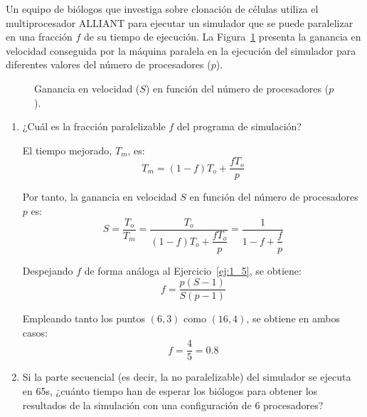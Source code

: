 \begin{ejercicio}
Un equipo de biólogos que investiga sobre clonación de células utiliza el multiprocesador ALLIANT para ejecutar un simulador que se puede paralelizar en una fracción $f$ de su tiempo de ejecución. La Figura~\ref{fig:1_10} presenta la ganancia en velocidad conseguida por la máquina paralela en la ejecución del simulador para diferentes valores del número de procesadores ($p$).
\begin{figure}
    \centering
    \caption{Ganancia en velocidad ($S$) en función del número de procesadores ($p$).}
    \label{fig:1_10}
\end{figure}
\begin{enumerate}
    \item ¿Cuál es la fracción paralelizable $f$ del programa de simulación?
    
    El tiempo mejorado, $T_m$, es:
    \begin{equation*}
        T_m = (1-f)T_o + \dfrac{fT_o}{p}
    \end{equation*}

    Por tanto, la ganancia en velocidad $S$ en función del número de procesadores $p$ es:
    \begin{equation*}
        S = \dfrac{T_o}{T_m} = \dfrac{T_o}{(1-f)T_o + \dfrac{fT_o}{p}} = \dfrac{1}{1-f + \dfrac{f}{p}}
    \end{equation*}

    Despejando $f$ de forma análoga al Ejercicio~\ref{ej:1_5}, se obtiene:
    \begin{equation*}
        f = \dfrac{p(S-1)}{S(p-1)}
    \end{equation*}

    Empleando tanto los puntos $(6,3)$ como $(16,4)$, se obtiene en ambos casos:
    \begin{equation*}
        f = \dfrac{4}{5} = 0.8
    \end{equation*}
    \item Si la parte secuencial (es decir, la no paralelizable) del simulador se ejecuta en 65s, ¿cuánto tiempo han de esperar los biólogos para obtener los resultados de la simulación con una configuración de 6 procesadores?
    

\end{enumerate}
\end{ejercicio}
